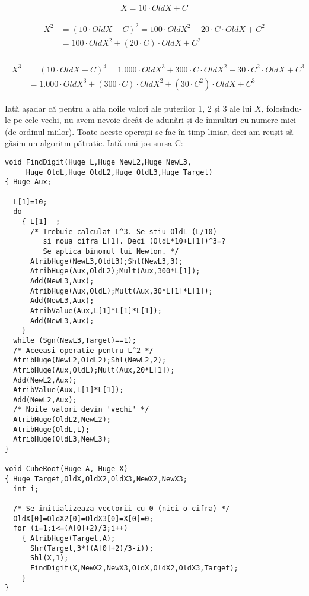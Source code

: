 \begin{equation}
  X = 10 \cdot OldX + C
\end{equation}

\begin{align}
  \begin{split}
    X^2 & = (10 \cdot OldX + C)^2 = 100 \cdot OldX^2 + 20 \cdot C \cdot OldX + C^2 \\
    & = 100 \cdot OldX^2 + (20 \cdot C) \cdot OldX + C^2
  \end{split}
\end{align}

\begin{align}
  \begin{split}
    X^3 & = (10 \cdot OldX + C)^3 = 1.000 \cdot OldX^3 + 300 \cdot C \cdot OldX^2 + 30 \cdot C^2 \cdot OldX + C^3 \\
    & = 1.000 \cdot OldX^3 + (300 \cdot C) \cdot OldX^2 + (30 \cdot C^2) \cdot OldX + C^3
  \end{split}
\end{align}

Iată așadar că pentru a afla noile valori ale puterilor 1, 2 și 3 ale lui $X$,
folosindu-le pe cele vechi, nu avem nevoie decât de adunări și de înmulțiri cu
numere mici (de ordinul miilor). Toate aceste operații se fac în timp liniar,
deci am reușit să găsim un algoritm pătratic. Iată mai jos sursa C:

\begin{verbatim}
void FindDigit(Huge L,Huge NewL2,Huge NewL3,
     Huge OldL,Huge OldL2,Huge OldL3,Huge Target)
{ Huge Aux;

  L[1]=10;
  do
    { L[1]--;
      /* Trebuie calculat L^3. Se stiu OldL (L/10)
         si noua cifra L[1]. Deci (OldL*10+L[1])^3=?
         Se aplica binomul lui Newton. */
      AtribHuge(NewL3,OldL3);Shl(NewL3,3);
      AtribHuge(Aux,OldL2);Mult(Aux,300*L[1]);
      Add(NewL3,Aux);
      AtribHuge(Aux,OldL);Mult(Aux,30*L[1]*L[1]);
      Add(NewL3,Aux);
      AtribValue(Aux,L[1]*L[1]*L[1]);
      Add(NewL3,Aux);
    }
  while (Sgn(NewL3,Target)==1);
  /* Aceeasi operatie pentru L^2 */
  AtribHuge(NewL2,OldL2);Shl(NewL2,2);
  AtribHuge(Aux,OldL);Mult(Aux,20*L[1]);
  Add(NewL2,Aux);
  AtribValue(Aux,L[1]*L[1]);
  Add(NewL2,Aux);
  /* Noile valori devin 'vechi' */
  AtribHuge(OldL2,NewL2);
  AtribHuge(OldL,L);
  AtribHuge(OldL3,NewL3);
}

void CubeRoot(Huge A, Huge X)
{ Huge Target,OldX,OldX2,OldX3,NewX2,NewX3;
  int i;

  /* Se initializeaza vectorii cu 0 (nici o cifra) */
  OldX[0]=OldX2[0]=OldX3[0]=X[0]=0;
  for (i=1;i<=(A[0]+2)/3;i++)
    { AtribHuge(Target,A);
      Shr(Target,3*((A[0]+2)/3-i));
      Shl(X,1);
      FindDigit(X,NewX2,NewX3,OldX,OldX2,OldX3,Target);
    }
}
\end{verbatim}

